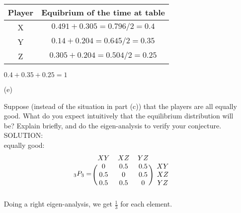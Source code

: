 \documentclass[12pt]{article}
\begin{document}
\begin{itemize}
\begin{table}[h!]

\small

\centering
\begin{tabular}{c|c}

Player & Equibrium of the time at table \\

\hline

X & $0.491+0.305 = 0.796/2 = 0.4$  \\

Y & $0.14+0.204=0.645/2=0.35$  \\

Z & $0.305+0.204=0.504/2=0.25$

\end{tabular}


\normalsize

\end{table} 
$0.4 + 0.35+0.25=1$

\item[(e)]

Suppose (instead of the situation in part (c)) that the players are all equally good. What do you expect intuitively that the equilibrium distribution will be? Explain briefly, and do the eigen-analysis to verify your conjecture. \fbox{\textit{[10 points]}}\\

SOLUTION:\\

equally good: \\
\[
_3P_3 =
\begin{blockarray}{cccc}
XY & XZ & YZ \\
\begin{block}{(ccc)c}
  0 & 0.5 & 0.5 & XY  \\
  0.5 & 0 & 0.5 & XZ \\
  0.5 & 0.5 & 0 & YZ  \\
\end{block}
\end{blockarray}
 \]
Doing a right eigen-analysis, we get $\frac{1}{3}$ for each element. 

\end{itemize}
\end{document}

